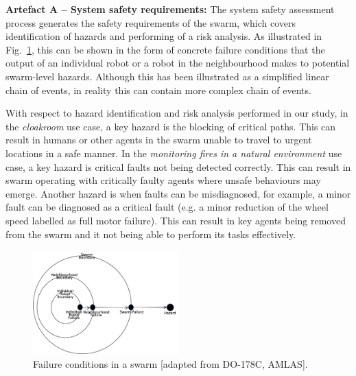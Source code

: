 \documentclass[lettersize,journal]{IEEEtran}
\begin{document}
\noindent \textbf{Artefact A -- System safety requirements: }
The system safety assessment process generates the safety requirements of the swarm, which covers identification of hazards and performing of a risk analysis. 
As illustrated in Fig.~\ref{failure-events}, this can be shown in the form of concrete failure conditions that the output of an individual robot or a robot in the neighbourhood makes to potential swarm-level hazards. 
Although this has been illustrated as a simplified linear chain of events, in reality this can contain more complex chain of events. 

With respect to hazard identification and risk analysis performed in our study, in the \textit{cloakroom} use case, a key hazard is the blocking of critical paths. 
This can result in humans or other agents in the swarm unable to travel to urgent locations in a safe manner. 
In the \textit{monitoring fires in a natural environment} use case, a key hazard is critical faults not being detected correctly. This can result in swarm operating with critically faulty agents where unsafe behaviours may emerge. Another hazard is when faults can be misdiagnosed, for example, a minor fault can be diagnosed as a critical fault (e.g. a minor reduction of the wheel speed labelled as full motor failure). This can result in key agents being removed from the swarm and it not being able to perform its tasks effectively.\\ 
\begin{figure}[!t]
	\centering
	\includegraphics[width=0.5\textwidth]{figures/stage1-failureevents.png}
	\caption{Failure conditions in a swarm [adapted from DO-178C, AMLAS].}
	\label{failure-events}
\end{figure}
\end{document}
